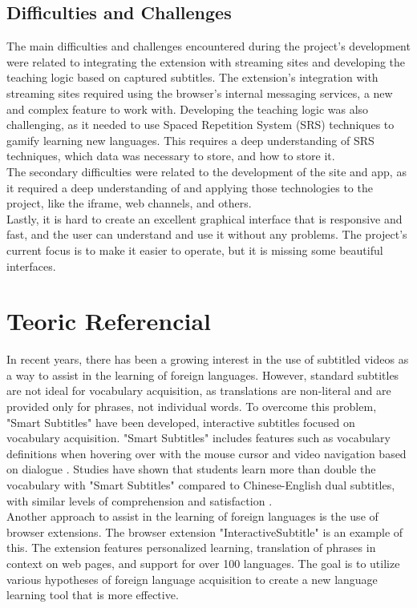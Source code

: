 \documentclass[12pt]{article}
\begin{document}
\subsection{Difficulties and Challenges}
The main difficulties and challenges encountered during the project's development were related to integrating the extension with streaming sites and developing the teaching logic based on captured subtitles. The extension's integration with streaming sites required using the browser's internal messaging services, a new and complex feature to work with. Developing the teaching logic was also challenging, as it needed to use Spaced Repetition System (SRS) techniques to gamify learning new languages. This requires a deep understanding of SRS techniques, which data was necessary to store, and how to store it. \\
The secondary difficulties were related to the development of the site and app, as it required a deep understanding of and applying those technologies to the project, like the iframe, web channels, and others. \\
Lastly, it is hard to create an excellent graphical interface that is responsive and fast, and the user can understand and use it without any problems. The project's current focus is to make it easier to operate, but it is missing some beautiful interfaces. \\ 

\section{Teoric Referencial}
In recent years, there has been a growing interest in the use of subtitled videos as a way to assist in the learning of foreign languages. However, standard subtitles are not ideal for vocabulary acquisition, as translations are non-literal and are provided only for phrases, not individual words. To overcome this problem, "Smart Subtitles" have been developed, interactive subtitles focused on vocabulary acquisition. "Smart Subtitles" includes features such as vocabulary definitions when hovering over with the mouse cursor and video navigation based on dialogue \cite{Kovacs13}. Studies have shown that students learn more than double the vocabulary with "Smart Subtitles" compared to Chinese-English dual subtitles, with similar levels of comprehension and satisfaction \cite{Kovacs14}. \\ 

Another approach to assist in the learning of foreign languages is the use of browser extensions. The browser extension "InteractiveSubtitle" \cite{ElBatanony21} is an example of this. The extension features personalized learning, translation of phrases in context on web pages, and support for over 100 languages. The goal is to utilize various hypotheses of foreign language acquisition to create a new language learning tool that is more effective. \\ 
\end{document}
